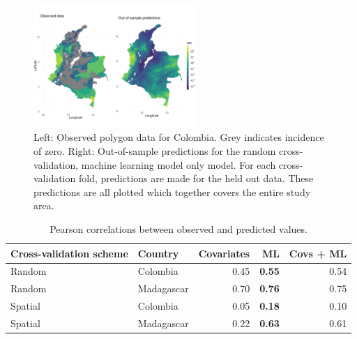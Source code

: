 \documentclass[11pt]{article}
\begin{document}
\begin{figure}
\centering
\includegraphics[trim={0 40mm 0 40mm}, width = 0.55\textwidth]{figs/col_obs_pred_map_ml.png} %
\caption{
  Left: Observed polygon data for Colombia. Grey indicates incidence of zero. Right: Out-of-sample predictions for the random cross-validation, machine learning model only model. For each cross-validation fold, predictions are made for the held out data. These predictions are all plotted which together covers the entire study area.
}
\label{f:map}
\end{figure}


\begin{table}
\caption{Pearson correlations between observed and predicted values. }
\centering
\begin{tabular}{llrrr}
Cross-validation scheme & Country &  Covariates &  ML &  Covs + ML \\
\hline 
 Random &  Colombia &  0.45 &  \textbf{0.55} &  0.54 \\
 Random &  Madagascar &  0.70 &  \textbf{0.76} &  0.75 \\
 Spatial &  Colombia &  0.05 &  \textbf{0.18} &  0.10 \\
 Spatial &  Madagascar &  0.22 &  \textbf{0.63} &  0.61 
\end{tabular}
\label{t:results}
\end{table}
\end{document}
